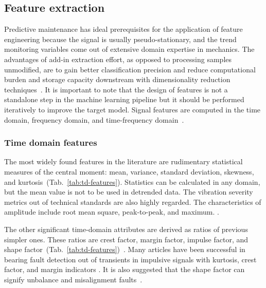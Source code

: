 \subsection{Feature extraction}
Predictive maintenance has ideal prerequisites for the application of feature engineering because the signal is usually pseudo-stationary, and the trend monitoring variables come out of extensive domain expertise in mechanics. The advantages of add-in extraction effort, as opposed to processing samples unmodified, are to gain better classification precision and reduce computational burden and storage capacity downstream with dimensionality reduction techniques~\cite{johnson_feature_2019}. It is important to note that the design of features is not a standalone step in the machine learning pipeline but it should be performed iteratively to improve the target model.  Signal features are computed in the time domain, frequency domain, and time-frequency domain~\cite{brito_fault_2021}. 

\subsubsection{Time domain features}
The most widely found features in the literature are rudimentary statistical measures of the central moment: mean, variance, standard deviation, skewness, and kurtosis~(Tab.~\ref{tab:td-features}). Statistics can be calculated in any domain, but the mean value is not to be used in detrended data. The vibration severity metrics out of technical standards are also highly regarded. The characteristics of amplitude include root mean square, peak-to-peak, and maximum. \cite{mostafavi_novel_2021}.

The other significant time-domain attributes are derived as ratios of previous simpler ones. These ratios are crest factor, margin factor, impulse factor, and shape factor~(Tab.~\ref{tab:td-features})~\cite{nandi_condition_2019}. Many articles have been successful in bearing fault detection out of transients in impulsive signals with kurtosis, crest factor, and margin indicators \cite{brito_fault_2021}. It is also suggested that the shape factor can signify unbalance and misalignment faults~\cite{nandi_condition_2019}.

